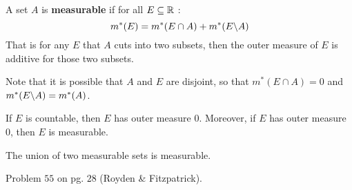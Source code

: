\begin{definition}
    A set $A$ is  \textbf{measurable} if for all $E \subseteq \mathbb{R}$ :
    \begin{equation}
        m^*(E)=m^*(E \cap A)+m^*(E\backslash A)
    \end{equation}
    That is for any $E$ that $A$ cuts into two subsets, then the outer measure
    of $E$ is additive for those two subsets.
\end{definition}
\begin{remark}
    Note that it is possible that $A$ and  $E$ are disjoint, so that  $m^*(E
    \cap A)=0$ and $m^*(E\backslash A)=m^*(A)$.
\end{remark}

\begin{lemma}\label{lemma.39}
    If $E$ is countable, then $E$ has outer measure $0$. Moreover, if  $E$ has
    outer measure  $0$, then  $E$ is measurable.
\end{lemma}

\begin{lemma}\label{leamm_4.40}
    The union of two measurable sets is measurable.
\end{lemma}

\begin{HW}
    Problem $55$ on pg. $28$ (Royden \& Fitzpatrick).
\end{HW}
